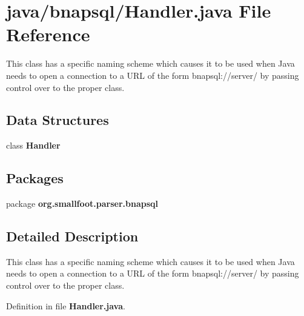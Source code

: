 \section{java/bnapsql/\+Handler.java File Reference}
\label{Handler_8java}


This class has a specific naming scheme which causes it to be used when Java needs to open a connection to a U\+R\+L of the form bnapsql\+://server/ by passing control over to the proper class.  


\subsection*{Data Structures}
\begin{DoxyCompactItemize}
\item 
class {\bf Handler}
\end{DoxyCompactItemize}
\subsection*{Packages}
\begin{DoxyCompactItemize}
\item 
package {\bf org.\+smallfoot.\+parser.\+bnapsql}
\end{DoxyCompactItemize}


\subsection{Detailed Description}
This class has a specific naming scheme which causes it to be used when Java needs to open a connection to a U\+R\+L of the form bnapsql\+://server/ by passing control over to the proper class. 



Definition in file {\bf Handler.\+java}.

